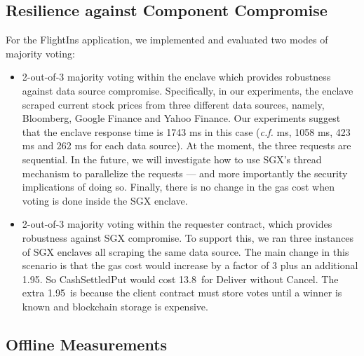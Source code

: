 \subsection{Resilience against Component Compromise}
\label{subsec:hedging}
For the {\sf FlightIns} application, 
we implemented and evaluated two modes of majority voting:
\begin{itemize}[leftmargin=3mm]
\item
2-out-of-3 majority voting within the enclave which provides robustness
against data source compromise.
Specifically, in our experiments, 
the enclave scraped current stock prices 
from three different data sources, 
namely, Bloomberg, Google Finance and Yahoo Finance.
Our experiments suggest that  
the enclave response time is 
1743 ms in this case ({\it c.f.} ms, 
1058 ms, 423 ms and 262  ms for 
each data source).
At the moment, the three requests 
are sequential. In the future, we will investigate how to 
use SGX's thread mechanism to parallelize the requests --- and more importantly
the security implications of doing so.
Finally, there is no change in the gas cost when voting is done
inside the SGX enclave.
\item
2-out-of-3 majority voting within the requester contract,
which provides robustness against 
SGX compromise.
To support this, we ran three instances of SGX enclaves all scraping
the same data source.  
The main change in this scenario is that 
the gas cost would increase by a factor of 3 plus an additional 1.95\textcent.
So {\sf CashSettledPut} would cost 13.8\textcent\ for Deliver without Cancel.
The extra 1.95\textcent\ is because the client contract must store votes
until a winner is known and blockchain storage is expensive.
\end{itemize}



\subsection{Offline Measurements}



